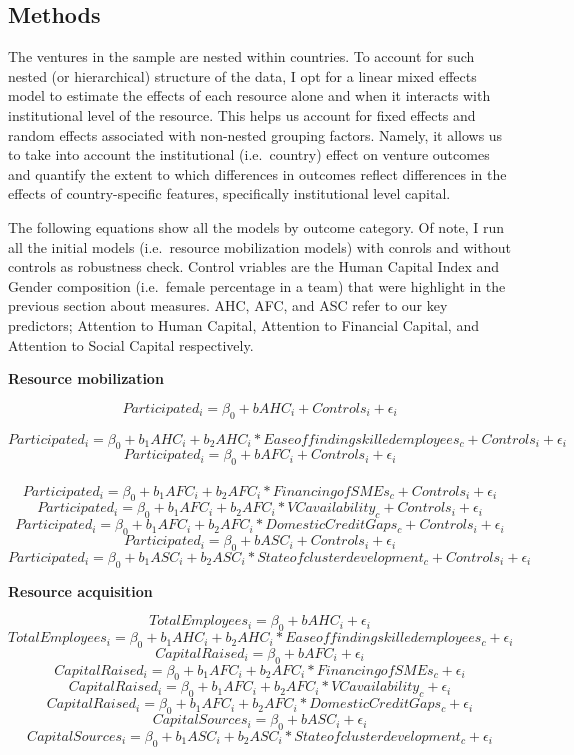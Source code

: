 \documentclass[
  english,
  man]{apa6}
\begin{document}
\hypertarget{methods}{%
\subsection{Methods}\label{methods}}

The ventures in the sample are nested within countries. To account for such nested (or hierarchical) structure of the data, I opt for a linear mixed effects model to estimate the effects of each resource alone and when it interacts with institutional level of the resource. This helps us account for fixed effects and random effects associated with non-nested grouping factors. Namely, it allows us to take into account the institutional (i.e.~country) effect on venture outcomes and quantify the extent to which differences in outcomes reflect differences in the effects of country-specific features, specifically institutional level capital.

The following equations show all the models by outcome category. Of note, I run all the initial models (i.e.~resource mobilization models) with conrols and without controls as robustness check. Control vriables are the Human Capital Index and Gender composition (i.e.~female percentage in a team) that were highlight in the previous section about measures. AHC, AFC, and ASC refer to our key predictors; Attention to Human Capital, Attention to Financial Capital, and Attention to Social Capital respectively.

\textbf{Resource mobilization}

\[{Participated_i} =  \beta_0 + b AHC_i + Controls_i + \epsilon_i \]

\[{Participated_i} =  \beta_0 + b_1 AHC_i + b_2 AHC_i * Ease of finding skilled employees_c+ Controls_i + \epsilon_i \]
\[{Participated_i} =  \beta_0 + b AFC_i +Controls_i + \epsilon_i \]\\
\[{Participated_i} =  \beta_0 + b_1 AFC_i + b_2 AFC_i * Financing of SMEs_c+ Controls_i + \epsilon_i \]
\[{Participated_i} =  \beta_0 + b_1 AFC_i + b_2 AFC_i * VC availability_c+ Controls_i + \epsilon_i \]
\[{Participated_i} =  \beta_0 + b_1 AFC_i + b_2 AFC_i * Domestic Credit Gaps_c+ Controls_i + \epsilon_i \]
\[{Participated_i} =  \beta_0 + b ASC_i + Controls_i + \epsilon_i \]
\[{Participated_i} =  \beta_0 + b_1 ASC_i + b_2 ASC_i * State of cluster development_c+ Controls_i + \epsilon_i \]

\textbf{Resource acquisition}

\[{Total Employees_i} =  \beta_0 + b AHC_i + \epsilon_i \]
\[{Total Employees_i} =  \beta_0 + b_1 AHC_i + b_2 AHC_i * Ease of finding skilled employees_c+ \epsilon_i \]
\[{CapitalRaised_i} =  \beta_0 + b AFC_i + \epsilon_i \]
\[{CapitalRaised_i} =  \beta_0 + b_1 AFC_i + b_2 AFC_i * Financing of SMEs_c + \epsilon_i \]
\[{CapitalRaised_i} =  \beta_0 + b_1 AFC_i + b_2 AFC_i * VC availability_c + \epsilon_i \]
\[{CapitalRaised_i} =  \beta_0 + b_1 AFC_i + b_2 AFC_i * Domestic Credit Gaps_c + \epsilon_i \]
\[{CapitalSources_i} =  \beta_0 + b ASC_i + \epsilon_i \]
\[{CapitalSources_i} =  \beta_0 + b_1 ASC_i + b_2 ASC_i * State of cluster development_c+ \epsilon_i \]
\end{document}
